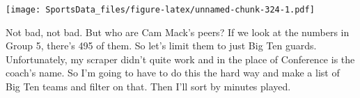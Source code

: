 \documentclass[
]{book}
\newenvironment{Shaded}{\begin{snugshade}}{\end{snugshade}}
\newcommand{\DecValTok}[1]{\textcolor[rgb]{0.00,0.00,0.81}{#1}}
\newcommand{\KeywordTok}[1]{\textcolor[rgb]{0.13,0.29,0.53}{\textbf{#1}}}
\newcommand{\NormalTok}[1]{#1}
\newcommand{\OperatorTok}[1]{\textcolor[rgb]{0.81,0.36,0.00}{\textbf{#1}}}
\newcommand{\StringTok}[1]{\textcolor[rgb]{0.31,0.60,0.02}{#1}}
\begin{document}
\texttt{[image: SportsData\_files/figure-latex/unnamed-chunk-324-1.pdf]}

Not bad, not bad. But who are Cam Mack's peers? If we look at the numbers in Group 5, there's 495 of them. So let's limit them to just Big Ten guards. Unfortunately, my scraper didn't quite work and in the place of Conference is the coach's name. So I'm going to have to do this the hard way and make a list of Big Ten teams and filter on that. Then I'll sort by minutes played.

\begin{Shaded}
\end{Shaded}
\end{document}
